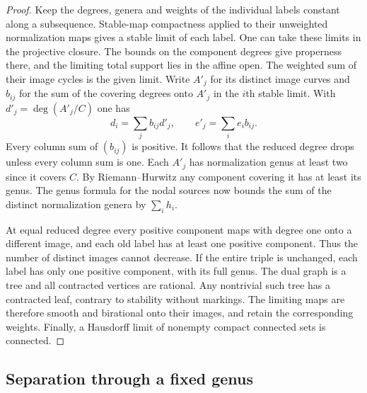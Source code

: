 \begin{proof}
Keep the degrees, genera and weights of the individual labels constant
along a subsequence. Stable-map compactness applied to their
unweighted normalization maps gives a stable limit of each label.
One can take these limits in the projective closure. The bounds on the
component degrees give properness there, and the limiting total support
lies in the affine open. The weighted sum of their image cycles is
the given limit. Write $A'_j$ for its distinct image curves and
$b_{ij}$ for the sum of the covering degrees onto $A'_j$ in the
$i$th stable limit. With $d'_j=\deg(A'_j/C)$ one has
\[
       d_i=\sum_j b_{ij}d'_j,\qquad e'_j=\sum_i e_i b_{ij}.
\]
Every column sum of $(b_{ij})$ is positive. It follows that the
reduced degree drops unless every column sum is one. Each $A'_j$
has normalization genus at least two since it covers $C$. By
Riemann--Hurwitz any component covering it has at least its genus.
The genus formula for the nodal sources now bounds the sum of the
distinct normalization genera by $\sum_i h_i$.

At equal reduced degree every positive component maps with degree
one onto a different image, and each old label has at least one
positive component. Thus the number of distinct images cannot
decrease. If the entire triple is unchanged, each label has only one
positive component, with its full genus. The dual graph is a tree and
all contracted vertices are rational. Any nontrivial such tree has a
contracted leaf, contrary to stability without markings. The
limiting maps are therefore smooth and birational onto their images,
and retain the corresponding weights. Finally, a Hausdorff limit of
nonempty compact connected sets is connected.
\end{proof}

\subsection{Separation through a fixed genus}

